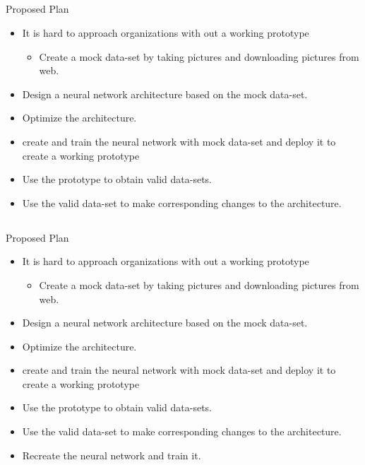 \documentclass{beamer}
\begin{document}
\subsection*{}
\begin{frame}{Proposed Plan}
\begin{itemize}
\item{
It is hard to approach organizations with out a working prototype
\begin{itemize}
\item{
Create a mock data-set by taking pictures and downloading pictures from web.
}
\end{itemize}
}
\item{
Design a neural network architecture based on the mock data-set.
}
\item{
Optimize the architecture.
}
\item{
create and train the neural network with mock data-set and deploy it to create a working prototype
}
\item{
Use the prototype to obtain valid data-sets.
}
\item{
Use the valid data-set to make corresponding changes to the architecture.
}
\end{itemize}
\end{frame}
\subsection*{}
\begin{frame}{Proposed Plan}
\begin{itemize}
\item{
It is hard to approach organizations with out a working prototype
\begin{itemize}
\item{
Create a mock data-set by taking pictures and downloading pictures from web.
}
\end{itemize}
}
\item{
Design a neural network architecture based on the mock data-set.
}
\item{
Optimize the architecture.
}
\item{
create and train the neural network with mock data-set and deploy it to create a working prototype
}
\item{
Use the prototype to obtain valid data-sets.
}
\item{
Use the valid data-set to make corresponding changes to the architecture.
}
\item{
Recreate the neural network and train it.
}
\end{itemize}
\end{frame}
\end{document}
